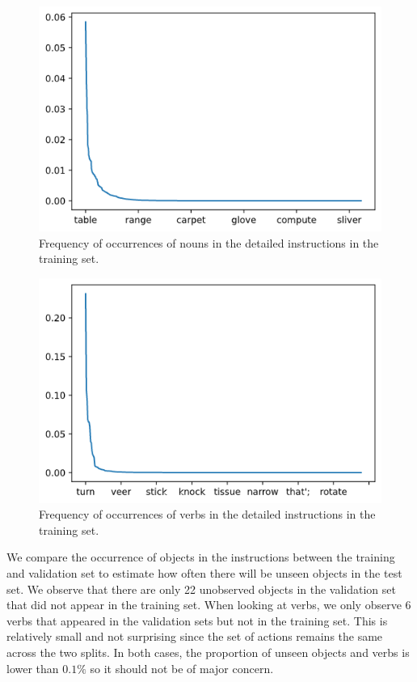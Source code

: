 \documentclass[11pt,a4paper]{article}
\begin{document}
\begin{figure}
    \centering
    \includegraphics[width=\linewidth]{Reports/1-Task-Definition-and-Data/train_noun_dist.png}
    \caption{Frequency of occurrences of nouns in the detailed instructions in the training set.}
    \label{fig:nouns_train}
\end{figure}

\begin{figure}
    \centering
    \includegraphics[width=\linewidth]{Reports/1-Task-Definition-and-Data/train_verb_dist.png}
    \caption{Frequency of occurrences of verbs in the detailed instructions in the training set.}
    \label{fig:nouns_train}
\end{figure}

We compare the occurrence of objects in the instructions between the training and validation set to estimate how often there will be unseen objects in the test set. We observe that there are only 22 unobserved objects in the validation set that did not appear in the training set.  When looking at verbs, we only observe 6 verbs that appeared in the validation sets but not in the training set. This is relatively small and not surprising since the set of actions remains the same across the two splits. In both cases, the proportion of unseen objects and verbs is lower than $0.1\%$ so it should not be of major concern.
\end{document}
